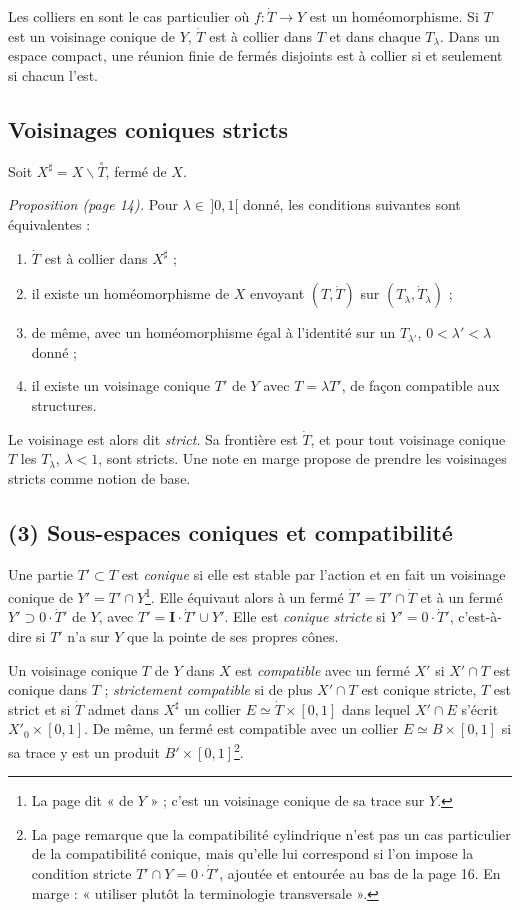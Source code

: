 \documentclass[11pt,a4paper]{article}
\begin{document}
Les colliers en sont le cas particulier où $f : \dot T \to Y$ est un
homéomorphisme. Si $T$ est un voisinage conique de $Y$, $\dot T$ est à collier
dans $T$ et dans chaque $T_\lambda$. Dans un espace compact, une réunion finie de
fermés disjoints est à collier si et seulement si chacun l'est.

\subsection*{Voisinages coniques stricts}

Soit $X^{\sharp} = X \smallsetminus \overset{\circ}{T}$, fermé de $X$.

\emph{Proposition (page 14).} Pour $\lambda \in \,]0,1[$ donné, les conditions
suivantes sont équivalentes :
\begin{enumerate}
\item[a)] $\dot T$ est à collier dans $X^{\sharp}$ ;
\item[b)] il existe un homéomorphisme de $X$ envoyant $(T, \dot T)$ sur
$(T_\lambda, \dot T_\lambda)$ ;
\item[b')] de même, avec un homéomorphisme égal à l'identité sur un $T_{\lambda'}$,
$0 < \lambda' < \lambda$ donné ;
\item[c)] il existe un voisinage conique $T'$ de $Y$ avec $T = \lambda T'$, de façon
compatible aux structures.
\end{enumerate}
Le voisinage est alors dit \emph{strict}. Sa frontière est $\dot T$, et pour tout
voisinage conique $T$ les $T_\lambda$, $\lambda < 1$, sont stricts. Une note en
marge propose de prendre les voisinages stricts comme notion de base.

\subsection*{(3) Sous-espaces coniques et compatibilité}

Une partie $T' \subset T$ est \emph{conique} si elle est stable par l'action et en
fait un voisinage conique de $Y' = T' \cap Y$\footnote{La page dit « de $Y$ » ;
c'est un voisinage conique de sa trace sur $Y$.}. Elle équivaut alors à un fermé
$\dot T' = T' \cap \dot T$ et à un fermé $Y' \supset 0 \cdot \dot T'$ de $Y$, avec
$T' = \mathbf{I} \cdot \dot T' \cup Y'$. Elle est \emph{conique stricte} si $Y' = 0
\cdot \dot T'$, c'est-à-dire si $T'$ n'a sur $Y$ que la pointe de ses propres
cônes.

Un voisinage conique $T$ de $Y$ dans $X$ est \emph{compatible} avec un fermé $X'$ si
$X' \cap T$ est conique dans $T$ ; \emph{strictement compatible} si de plus $X' \cap T$ est conique stricte, $T$ est strict et si $\dot T$ admet dans $X^{\sharp}$ un collier $E \simeq \dot T \times
[0,1]$ dans lequel $X' \cap E$ s'écrit $X'_0 \times [0,1]$. De même, un fermé est
compatible avec un collier $E \simeq B \times [0,1]$ si sa trace y est un produit
$B' \times [0,1]$\footnote{La page remarque que la compatibilité cylindrique n'est
pas un cas particulier de la compatibilité conique, mais qu'elle lui correspond si
l'on impose la condition stricte $T' \cap Y = 0 \cdot \dot T'$, ajoutée et entourée
au bas de la page 16. En marge : « utiliser plutôt la terminologie transversale ».}.
\end{document}
